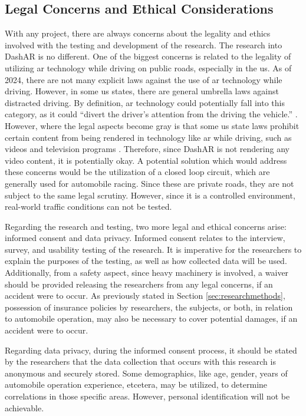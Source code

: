     \subsection{Legal Concerns and Ethical Considerations}
        \par With any project, there are always concerns about the legality and ethics involved with the testing and development of the research. The research into DashAR is no different. One of the biggest concerns is related to the legality of utilizing \gls{ar} technology while driving on public roads, especially in the \gls{us}. As of 2024, there are not many explicit laws against the use of \gls{ar} technology while driving. However, in some \gls{us} states, there are general umbrella laws against distracted driving. By definition, \gls{ar} technology could potentially fall into this category, as it could ``divert the driver's attention from the driving the vehicle.'' \cite{KNI2024}. However, where the legal aspects become gray is that some \gls{us} state laws prohibit certain content from being rendered in technology like \gls{ar} while driving, such as videos and television programs \cite{KNI2024}. Therefore, since DashAR is not rendering any video content, it is potentially okay. A potential solution which would address these concerns would be the utilization of a closed loop circuit, which are generally used for automobile racing. Since these are private roads, they are not subject to the same legal scrutiny. However, since it is a controlled environment, real-world traffic conditions can not be tested.

        \par Regarding the research and testing, two more legal and ethical concerns arise: informed consent and data privacy. Informed consent relates to the interview, survey, and usability testing of the research. It is imperative for the researchers to explain the purposes of the testing, as well as how collected data will be used. Additionally, from a safety aspect, since heavy machinery is involved, a waiver should be provided releasing the researchers from any legal concerns, if an accident were to occur. As previously stated in Section \ref{sec:researchmethods}, possession of insurance policies by researchers, the subjects, or both, in relation to automobile operation, may also be necessary to cover potential damages, if an accident were to occur.

        \par Regarding data privacy, during the informed consent process, it should be stated by the researchers that the data collection that occurs with this research is anonymous and securely stored. Some demographics, like age, gender, years of automobile operation experience, etcetera, may be utilized, to determine correlations in those specific areas. However, personal identification will not be achievable.


